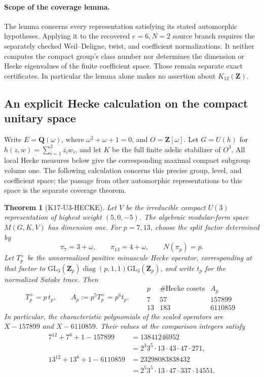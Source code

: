 \documentclass[11pt,a4paper]{article}
\newtheorem{theorem}{Theorem}[section]
\theoremstyle{definition}
\begin{document}
\paragraph{Scope of the coverage lemma.}
The lemma concerns every representation satisfying its stated automorphic
hypotheses. Applying it to the recovered $e=6,N=2$ source branch requires
the separately checked Weil--Deligne, twist, and coefficient normalizations.
It neither computes the compact group's class number nor determines the
dimension or Hecke eigenvalues of the finite coefficient space. Those
remain separate exact certificates. In particular the lemma alone makes
no assertion about $K_{12}(\mathbf Z)$.

\subsection{An explicit Hecke calculation on the compact unitary space}
\label{sec:u3-hecke}

Write $E=\mathbf Q(\omega)$, where $\omega^2+\omega+1=0$, and
$O=\mathbf Z[\omega]$.  Let $G=U(h)$ for
$h(z,w)=\sum_{i=1}^3\overline{z_i}w_i$, and let $K$ be the full
finite adelic stabilizer of $O^3$.  All local Hecke measures below give
the corresponding maximal compact subgroup volume one.  The following
calculation concerns this precise group, level, and coefficient space;
the passage from other automorphic representations to this space is the
separate coverage theorem.

\begin{theorem}[K17-U3-HECKE]\label{thm:u3-hecke}
Let $V$ be the irreducible compact $U(3)$ representation of highest
weight $(5,0,-5)$.  The algebraic modular-form space $M(G,K,V)$ has
dimension one.  For $p=7,13$, choose the split factor determined by
\[
 \pi_7=3+\omega,\qquad \pi_{13}=4+\omega,
 \qquad N(\pi_p)=p.
\]
Let $T_p^+$ be the unnormalized positive minuscule Hecke operator,
corresponding at that factor to
$\mathrm{GL}_3(\mathbf Z_p)\operatorname{diag}(p,1,1)
 \mathrm{GL}_3(\mathbf Z_p)$, and write $t_p$ for the normalized
Satake trace.  Then
\[
 T_p^+=p\,t_p,\qquad A_p:=p^5T_p^+=p^6t_p,
 \qquad
 \begin{array}{c|r|r}
 p&\#\text{Hecke cosets}&A_p\\ \hline
 7&57&157899\\
 13&183&6110859
 \end{array}
 \tag{UH.1}
\]
In particular, the characteristic polynomials of the scaled operators
are $X-157899$ and $X-6110859$.  Their values at the comparison
integers satisfy
\begin{align*}
 7^{12}+7^6+1-157899
   &=13841246952\\
   &=2^3 3^5\cdot13\cdot43\cdot47\cdot271,\\
 13^{12}+13^6+1-6110859
   &=23298083838432\\
   &=2^5 3^5\cdot13\cdot47\cdot337\cdot14551.
\end{align*}
\end{theorem}
\end{document}
